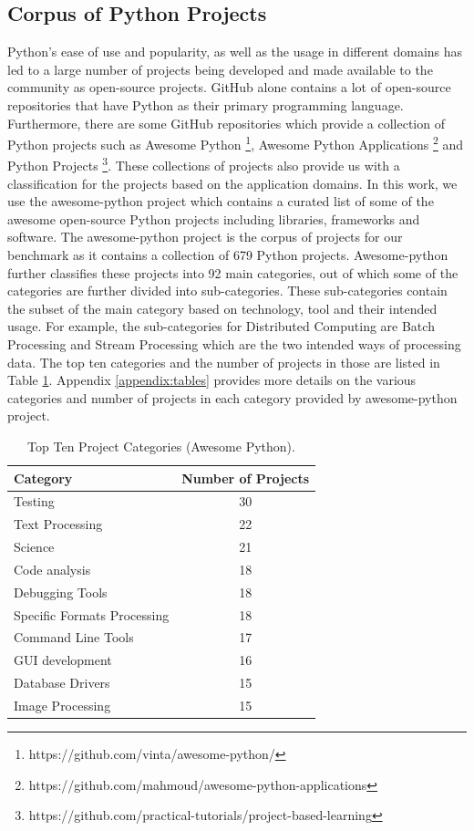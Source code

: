 \subsection{Corpus of Python Projects}
\label{approach:corpus of python projects}
Python's ease of use and popularity, as well as the usage in different domains has led to a large number of projects being developed and made available to the community as open-source projects.
GitHub alone contains a lot of open-source repositories that have Python as their primary programming language.
Furthermore, there are some GitHub repositories which provide a collection of Python projects such as Awesome Python \footnote{https://github.com/vinta/awesome-python/}, Awesome Python Applications \footnote{https://github.com/mahmoud/awesome-python-applications} and Python Projects \footnote{https://github.com/practical-tutorials/project-based-learning}.
These collections of projects also provide us with a classification for the projects based on the application domains.
In this work, we use the awesome-python project which contains a curated list of some of the awesome open-source Python projects including libraries, frameworks and software. 
The awesome-python project is the corpus of projects for our benchmark as it contains a collection of 679 Python projects.
Awesome-python further classifies these projects into 92 main categories, out of which some of the categories are further divided into sub-categories.
These sub-categories contain the subset of the main category based on technology, tool and their intended usage.
For example, the sub-categories for Distributed Computing are Batch Processing and Stream Processing which are the two intended ways of processing data.
The top ten categories and the number of projects in those are listed in Table \ref{table:awesome-python}.
Appendix \ref{appendix:tables} provides more details on the various categories and number of projects in each category provided by awesome-python project.

\begin{table}[ht]
    \centering
    \begin{tabular}{lc}
    \hline
    \textbf{Category} & \textbf{Number of Projects}\\
    \hline
    Testing & 30\\
    Text Processing & 22\\
    Science & 21\\
    Code analysis & 18\\
    Debugging Tools & 18\\
    Specific Formats Processing & 18\\
    Command Line Tools & 17\\
    GUI development & 16\\
    Database Drivers & 15\\
    Image Processing & 15\\
    \hline
    \end{tabular}
    \caption{Top Ten Project Categories (Awesome Python).}
    \label{table:awesome-python}
\end{table}

